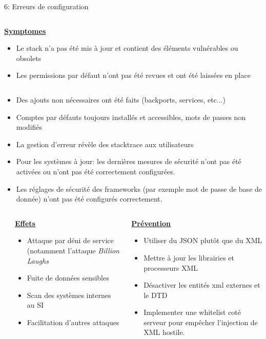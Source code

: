 \documentclass[final,hyperref={pdfpagelabels=false}]{beamer}
\begin{document}
\begin{frame}[t]
\begin{columns}[t]
\begin{column}{.465\textwidth}
\begin{block}{6: Erreurs de configuration}
\begin{columns}[T]
			\begin{column}{.875\textwidth}
				\uline{\uline{\textbf{Symptomes}}}
				\begin{itemize}
					\item Le stack n'a pas été mis à jour et contient des éléments vulnérables ou obsolets
					\item Les permissions par défaut n'ont pas été revues et ont été laissées en place
				\end{itemize}
			\end{column}
		\end{columns}
		\begin{itemize}
			\item Des ajouts non nécessaires ont été faits (backports, services, etc...)
			\item Comptes par défauts toujours installés et accessibles, mots de passes non modifiés
			\item La gestion d'erreur révèle des stacktrace aux utilisateurs
			\item Pour les systèmes à jour: les dernières mesures de sécurité n'ont pas été activées ou n'ont pas été correctement configurées.
			\item Les réglages de sécurité des frameworks (par exemple mot de passe de base de donnée) n'ont pas été configurés correctement.
		\end{itemize}
		\begin{columns}[T]
			\begin{column}{.01\textwidth}
			\end{column}
			\begin{column}{0.495\textwidth}
				\vfill
				\uline{\textbf{Effets}}
				\begin{itemize}
					\item Attaque par déni de service (notamment l'attaque \textit{Billion
						Laughs}
					\item Fuite de données sensibles
					\item Scan des systèmes internes au SI
					\item Facilitation d'autres attaques
				\end{itemize}
				\vfill
			\end{column}
			\begin{column}{0.495\textwidth}
				\vfill
				\uline{\textbf{Prévention}}
				\begin{itemize}
					\item Utiliser du JSON plutôt que du XML
					\item Mettre à jour les librairies et processeurs XML
					\item Désactiver les entités xml externes et le DTD
					\item Implementer une whitelist coté serveur pour empêcher
						l'injection de XML hostile.
				\end{itemize}
			\end{column}
		\end{columns}
	\end{block}


\end{column}
\end{columns}
\end{frame}
\end{document}
